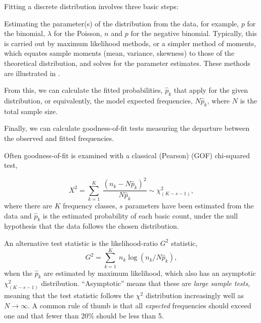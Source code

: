 \documentclass[10pt,krantz2]{krantz}\usepackage[]{graphicx}\usepackage[]{color}
\begin{document}
Fitting a discrete distribution involves three basic steps:
\begin{enumerate*}

\item Estimating the parameter(s) of the distribution from the
data, for example, $p$ for the binomial, $\lambda$ for the
Poisson, $n$ and $p$ for the negative binomial. Typically,
this is carried out by maximum likelihood methods, or a simpler
method of moments, which equates sample moments (mean, variance, skewness) to those of the theoretical distribution, and solves
for the parameter estimates.  These methods are illustrated in .

\item  From this, we can calculate the fitted probabilities,
$\hat{p}_k$ that apply for the given distribution,
or equivalently, the model expected frequencies,
$N \hat{p}_k$, where $N$ is the total sample size.

\item Finally, we can calculate goodness-of-fit tests
measuring the departure between the observed and
fitted frequencies.
\end{enumerate*}

Often goodness-of-fit is examined with a classical (Pearson)
 (GOF) chi-squared test,

\begin{equation}\label{eq:chi2}
  X^2 = \sum_{k=1}^K \:
  \frac{{ ( n_k - N \hat{p}_k ) }^2}
  { N \hat{p}_k }  \sim \chi^2_{( K-s-1 )}
  \comma
\end{equation}
where there are $K$ frequency classes,
$s$ parameters have been estimated from the data and
\(\hat{p}_k\) is the estimated probability of each basic count,
under the null hypothesis that the data follows the chosen distribution.

An alternative test statistic is the likelihood-ratio $G^2$
statistic,
\begin{equation}\label{eq:g2}
 G^2 = \sum_{k=1}^K \: n_k \log ( n_k / N \hat{p}_k )
 \comma
\end{equation}
when the $\hat{p}_k$ are estimated by maximum likelihood,
which also has an asymptotic $\chi^2_{(K - s - 1)}$ distribution.
``Asymptotic'' means that these are \emph{large sample tests},
meaning that the test statistic follows the $\chi^2$ distribution
increasingly well as $N \rightarrow \infty$.
A common rule of thumb is that all \emph{expected} frequencies
should exceed one and that fewer than 20\% should be less than 5.
\end{document}
